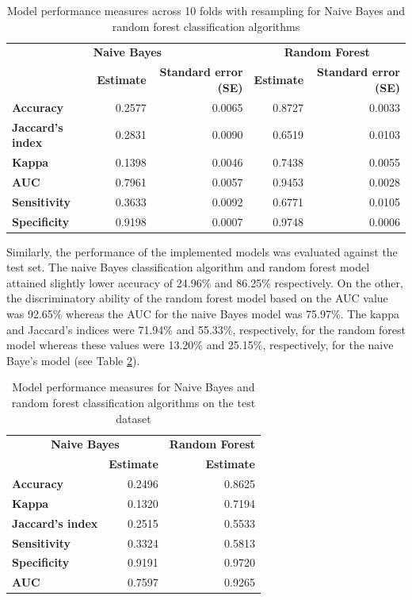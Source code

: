 \documentclass[
  10pt,
]{article}
\begin{document}
\begin{table}[H]

\caption{\label{tab:two}Model performance measures across 10 folds with resampling for Naive Bayes and random forest classification algorithms}
\centering
\begin{tabular}[t]{>{}l|r|r|r|r}
\hline
\multicolumn{3}{c|}{\textbf{Naive Bayes}} & \multicolumn{2}{c}{\textbf{Random Forest}} \\
\cline{1-3} \cline{4-5}
\textbf{ } & \textbf{Estimate} & \textbf{Standard error (SE)} & \textbf{Estimate} & \textbf{Standard error (SE)}\\
\hline
\textbf{Accuracy} & 0.2577 & 0.0065 & 0.8727 & 0.0033\\
\hline
\textbf{Jaccard's index} & 0.2831 & 0.0090 & 0.6519 & 0.0103\\
\hline
\textbf{Kappa} & 0.1398 & 0.0046 & 0.7438 & 0.0055\\
\hline
\textbf{AUC} & 0.7961 & 0.0057 & 0.9453 & 0.0028\\
\hline
\textbf{Sensitivity} & 0.3633 & 0.0092 & 0.6771 & 0.0105\\
\hline
\textbf{Specificity} & 0.9198 & 0.0007 & 0.9748 & 0.0006\\
\hline
\end{tabular}
\end{table}

Similarly, the performance of the implemented models was evaluated against the test set. The naive Bayes classification algorithm and random forest model attained slightly lower accuracy of 24.96\% and 86.25\% respectively. On the other, the discriminatory ability of the random forest model based on the AUC value was 92.65\% whereas the AUC for the naive Bayes model was 75.97\%. The kappa and Jaccard's indices were 71.94\% and 55.33\%, respectively, for the random forest model whereas these values were 13.20\% and 25.15\%, respectively, for the naive Baye's model (see Table \ref{tab:three}).

\begin{table}[H]

\caption{\label{tab:three}Model performance measures for Naive Bayes and random forest classification algorithms on the test dataset}
\centering
\begin{tabular}[t]{>{}l|r|r}
\hline
\multicolumn{2}{c|}{\textbf{Naive Bayes}} & \multicolumn{1}{c}{\textbf{Random Forest}} \\
\cline{1-2} \cline{3-3}
\textbf{ } & \textbf{Estimate} & \textbf{Estimate}\\
\hline
\textbf{Accuracy} & 0.2496 & 0.8625\\
\hline
\textbf{Kappa} & 0.1320 & 0.7194\\
\hline
\textbf{Jaccard's index} & 0.2515 & 0.5533\\
\hline
\textbf{Sensitivity} & 0.3324 & 0.5813\\
\hline
\textbf{Specificity} & 0.9191 & 0.9720\\
\hline
\textbf{AUC} & 0.7597 & 0.9265\\
\hline
\end{tabular}
\end{table}
\end{document}
